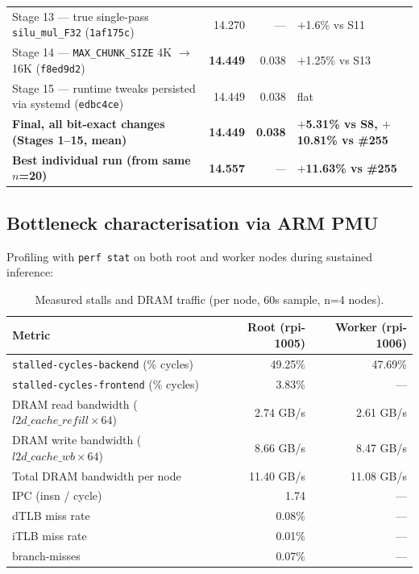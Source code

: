 \documentclass[10pt,a4paper]{article}
\begin{document}
\begin{table}[H]
\begin{tabular}{p{8.4cm}rrl}
Stage 13 --- true single-pass \texttt{silu\_mul\_F32} (\texttt{1af175c}) & 14.270 & --- & $+$1.6\% vs S11 \\
Stage 14 --- \texttt{MAX\_CHUNK\_SIZE} 4K $\to$ 16K (\texttt{f8ed9d2}) & \textbf{14.449} & 0.038 & $+$1.25\% vs S13 \\
Stage 15 --- runtime tweaks persisted via systemd (\texttt{edbc4ce}) & 14.449 & 0.038 & flat \\
\midrule
\textbf{Final, all bit-exact changes (Stages 1--15, mean)} & \textbf{14.449} & \textbf{0.038} & \textbf{$+$5.31\% vs S8, $+$10.81\% vs \#255} \\
\textbf{Best individual run (from same $n$=20)}            & \textbf{14.557} & \emph{---}    & \textbf{$+$11.63\% vs \#255} \\
\bottomrule
\end{tabular}
\end{table}

\subsection{Bottleneck characterisation via ARM PMU}

Profiling with \texttt{perf stat} on both root and worker nodes during sustained inference:

\begin{table}[H]
\centering
\caption{Measured stalls and DRAM traffic (per node, 60s sample, n=4 nodes).}
\small
\begin{tabular}{lrr}
\toprule
\textbf{Metric} & \textbf{Root (rpi-1005)} & \textbf{Worker (rpi-1006)} \\
\midrule
\texttt{stalled-cycles-backend} (\% cycles) & 49.25\% & 47.69\% \\
\texttt{stalled-cycles-frontend} (\% cycles) & 3.83\% & --- \\
DRAM read bandwidth ($l2d\_cache\_refill \times 64$) & 2.74 GB/s & 2.61 GB/s \\
DRAM write bandwidth ($l2d\_cache\_wb \times 64$) & 8.66 GB/s & 8.47 GB/s \\
Total DRAM bandwidth per node & 11.40 GB/s & 11.08 GB/s \\
IPC (insn / cycle) & 1.74 & --- \\
dTLB miss rate & 0.08\% & --- \\
iTLB miss rate & 0.01\% & --- \\
branch-misses & 0.07\% & --- \\
\bottomrule
\end{tabular}
\end{table}
\end{document}

